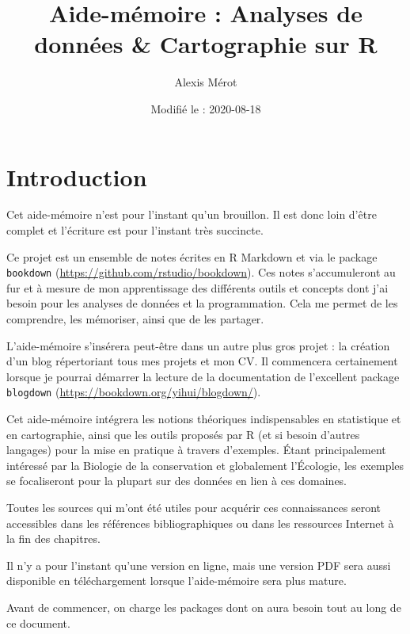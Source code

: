 \documentclass[
  french,
]{book}
\title{Aide-mémoire : Analyses de données \& Cartographie sur R}
\author{Alexis Mérot}
\date{Modifié le : 2020-08-18}
\newenvironment{infobox}[1]
  {
  \begin{itemize}
  \renewcommand{\labelitemi}{
    \raisebox{-.7\height}[0pt][0pt]{
      {\setkeys{Gin}{width=3em,keepaspectratio}
        \texttt{[image: images/\#1]}}
    }
  }
  \setlength{\fboxsep}{1em}
  \begin{blackbox}
  \item
  }
  {
  \end{blackbox}
  \end{itemize}
  }
\begin{document}
\maketitle

{
\setcounter{tocdepth}{1}
\tableofcontents
}
\hypertarget{introduction}{%
\chapter*{Introduction}\label{introduction}}

\begin{infobox}{caution}

Cet aide-mémoire n'est pour l'instant qu'un brouillon. Il est donc loin d'être complet et l'écriture est pour l'instant très succincte.

\end{infobox}

Ce projet est un ensemble de notes écrites en R Markdown \citep{R-rmarkdown} et via
le package \texttt{bookdown} (\url{https://github.com/rstudio/bookdown}). Ces notes
s'accumuleront au fur et à mesure de mon apprentissage des différents outils et
concepts dont j'ai besoin pour les analyses de données et la programmation. Cela
me permet de les comprendre, les mémoriser, ainsi que de les partager.

L'aide-mémoire s'insérera peut-être dans un autre plus gros projet : la création
d'un blog répertoriant tous mes projets et mon CV. Il commencera certainement
lorsque je pourrai démarrer la lecture de la documentation de l'excellent
package \texttt{blogdown} (\url{https://bookdown.org/yihui/blogdown/}).

Cet aide-mémoire intégrera les notions théoriques indispensables en statistique
et en cartographie, ainsi que les outils proposés par R (et si besoin d'autres
langages) pour la mise en pratique à travers d'exemples. Étant principalement
intéressé par la Biologie de la conservation et globalement l'Écologie, les
exemples se focaliseront pour la plupart sur des données en lien à ces domaines.

Toutes les sources qui m'ont été utiles pour acquérir ces connaissances seront
accessibles dans les références bibliographiques ou dans les ressources Internet
à la fin des chapitres.

Il n'y a pour l'instant qu'une version en ligne, mais une version PDF sera aussi disponible en téléchargement lorsque l'aide-mémoire sera plus mature.

Avant de commencer, on charge les packages dont on aura besoin tout au long de
ce document.
\end{document}
